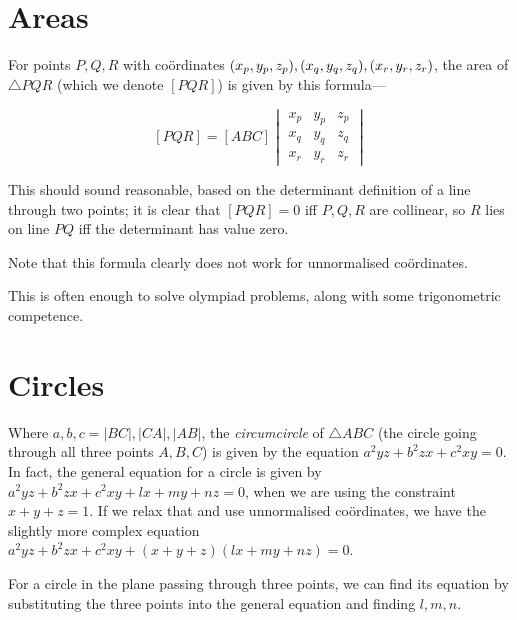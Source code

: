 \section{Areas}
\begin{multicols}{2}
For points \(P,Q,R\) with co\"ordinates  \((x_p,y_p,z_p),(x_q,y_q,z_q),\\(x_r,y_r,z_r)\), the area of \(\triangle{}PQR\) (which we denote \([PQR]\)) is given by this formula---

\[
[PQR]=[ABC]\begin{vmatrix}x_p&y_p&z_p\\x_q&y_q&z_q\\x_r&y_r&z_r\end{vmatrix}
\]

This should sound reasonable, based on the determinant definition of a line through two points; it is clear that \([PQR]=0\) iff \(P,Q,R\) are collinear, so \(R\) lies on line \(PQ\) iff the determinant has value zero.

Note that this formula clearly does not work for unnormalised co\"ordinates.

This is often enough to solve olympiad problems, along with some trigonometric competence.
\end{multicols}
\section{Circles}
\begin{multicols}{2}
Where \(a,b,c=|BC|,|CA|,|AB|\), the \textit{circumcircle} of \(\triangle{}ABC\) (the circle going through all three points \(A,B,C\)) is given by the equation \(a^2yz+b^2zx+c^2xy=0\). In fact, the general equation for a circle is given by \(a^2yz+b^2zx+c^2xy+lx+my+nz=0\), when we are using the constraint \(x+y+z=1\). If we relax that and use unnormalised co\"ordinates, we have the slightly more complex equation \(a^2yz+b^2zx+c^2xy+(x+y+z)(lx+my+nz)=0\).

For a circle in the plane passing through three points, we can find its equation by substituting the three points into the general equation and finding \(l,m,n\).
\end{multicols}
